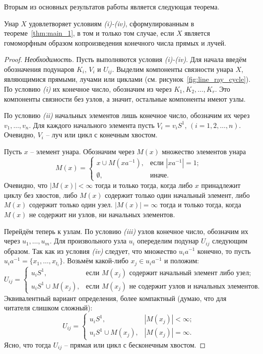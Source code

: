 \documentclass[11pt,twoside,final
]{article}
\begin{document}
Вторым из основных результатов работы является следующая теорема.
\begin{theorem} \label{thm:main_2}
	Унар $X$ удовлетворяет условиям \textit{(i)-(iv)}, сформулированным в теореме~\ref{thm:main_1}, в том и только том случае, если $X$ является гомоморфным образом копроизведения конечного числа прямых и лучей.
\end{theorem}
\begin{proof}
	\textit{Необходимость.}
	Пусть выполняются условия \textit{(i)-(iv)}.
	Для начала введём обозначения подунаров $K_i$, $V_i$ и $U_{ij}$.
	Выделим компоненты связности унара $X$, являющимися прямыми, лучами или циклами (см. рисунок~\ref{fig:line_ray_cycle}).
	По условию \textit{(i)} их конечное число, обозначим из через $K_1, K_2, \ldots, K_r$.
	Это компоненты связности без узлов, а значит, остальные компоненты имеют узлы.

	По условию \textit{(ii)} начальных элементов лишь конечное число, обозначим их через $v_1,\ldots, v_n$.
	Для каждого начального элемента пусть $V_i = v_i S^1$, $(i=1,2,\ldots,n)$.
	Очевидно, $V_i$ -- луч или цикл с конечным хвостом.

	Пусть $x$ -- элемент унара.
	Обозначим через $M(x)$ множество элементов унара
	\[
		M(x) =
		\begin{cases}
			x \cup M(x a^{-1}), & \text{если } |x a^{-1}| = 1; \\
			\emptyset,          & \text{иначе}.
		\end{cases}
	\]
	Очевидно, что $|M(x)| < \infty$ тогда и только тогда, когда либо $x$ принадлежит циклу без хвостов, либо $M(x)$ содержит только один начальный элемент, либо $M(x)$ содержит только один узел.
	$|M(x)| = \infty$ тогда и только тогда, когда $M(x)$ не содержит ни узлов, ни начальных элементов.

	Перейдём теперь к узлам.
	По условию \textit{(iii)} узлов конечное число, обозначим их через $ u_1, \ldots, u_m$.
	Для произвольного узла $u_i$ опеределим подунар $U_{ij}$ следующим образом.
	Так как из условия \textit{(iv)} следует, что множество $u_i a^{-1}$ конечно, то пусть $u_i a^{-1} = \{ x_1, \ldots, x_{t_i} \}$.
	Возьмём какой-либо $x_j \in u_i a^{-1}$ и положим:
	\[
		U_{ij} =
		\begin{cases}
			u_i S^1,             & \text{если } M(x_j) \text{ содержит начальный элемент либо узел};    \\
			u_i S^1 \cup M(x_j), & \text{если } M(x_j) \text{ не содержит узлов и начальных элементов}.
		\end{cases}
	\]
	Эквивалентный вариант определения, более компактный (думаю, что для читателя слишком сложный):
	\[
		U_{ij} =
		\begin{cases}
			u_i S^1,             & |M(x_j)| < \infty; \\
			u_i S^1 \cup M(x_j), & |M(x_j)| = \infty.
		\end{cases}
	\]
	Ясно, что тогда $U_{ij}$ -- прямая или цикл с бесконечным хвостом.


\end{proof}
\end{document}
